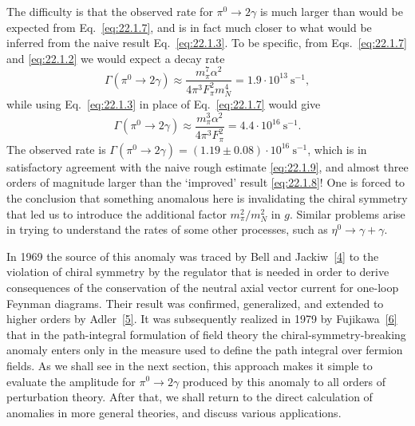 The difficulty is that the observed rate for $\pi^0\to2\gamma$ is much
larger than would be expected from Eq.~\eqref{eq:22.1.7}, and is in fact much
closer to what would be inferred from the naive result
Eq.~\eqref{eq:22.1.3}. To be specific, from Eqs.~\eqref{eq:22.1.7} and
\eqref{eq:22.1.2} we would expect a decay rate
\begin{equation}
 \Gamma(\pi^0\to2\gamma)
 \approx\frac{m_\pi^7\alpha^2}{4\pi^3F_\pi^2m_N^4}
 =1.9\cdot10^{13}\ \mathrm{s}^{-1},
 \tag{22.1.8}\label{eq:22.1.8}
\end{equation}
while using Eq.~\eqref{eq:22.1.3} in place of Eq.~\eqref{eq:22.1.7} would
give
\begin{equation}
 \Gamma(\pi^0\to2\gamma)
 \approx\frac{m_\pi^3\alpha^2}{4\pi^3F_\pi^2}
 =4.4\cdot10^{16}\ \mathrm{s}^{-1}.
 \tag{22.1.9}\label{eq:22.1.9}
\end{equation}
The observed rate is
$\Gamma(\pi^0\to2\gamma)=(1.19\pm0.08)\cdot10^{16}\ \mathrm{s}^{-1}$,
which is in satisfactory agreement with the naive rough estimate
\eqref{eq:22.1.9}, and almost three orders of magnitude larger than the
`improved' result \eqref{eq:22.1.8}! One is forced to the conclusion that
something anomalous here is invalidating the chiral symmetry that led us to
introduce the additional factor $m_\pi^2/m_N^2$ in $g$. Similar problems
arise in trying to understand the rates of some other processes, such as
$\eta^0\to\gamma+\gamma$.

In 1969 the source of this anomaly was traced by Bell and
Jackiw~\hyperref[ch22-ref-4]{[4]} to the violation of chiral symmetry by the
regulator that is needed in order to derive consequences of the conservation
of the neutral axial vector current for one-loop Feynman diagrams. Their
result was confirmed, generalized, and extended to higher orders by
Adler~\hyperref[ch22-ref-5]{[5]}. It was subsequently realized in 1979 by
Fujikawa~\hyperref[ch22-ref-6]{[6]} that in the path-integral formulation of
field theory the chiral-symmetry-breaking anomaly enters only in the measure
used to define the path integral over fermion fields. As we shall see in the
next section, this approach makes it simple to evaluate the amplitude for
$\pi^0\to2\gamma$ produced by this anomaly to all orders of perturbation
theory. After that, we shall return to the direct calculation of anomalies in
more general theories, and discuss various applications.
